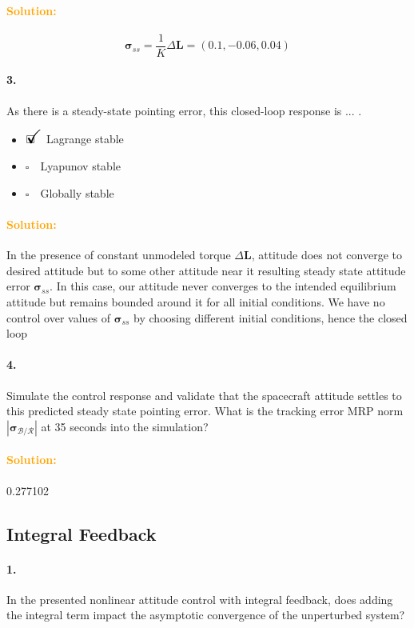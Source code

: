 \documentclass[12pt, a4paper]{article}
\newcommand{\ans}{\item[]$\rlap{\LARGE{\checkmark}}\square\quad$}
\newcommand{\noans}{\item[]$\square\quad$}
\begin{document}
\paragraph{\textcolor{orange}{Solution:}}
$$
\bm{\sigma}_{ss} = \frac{1}{K}\Delta \bm{L} = (0.1, -0.06, 0.04)
$$

\paragraph{3.}
As there is a steady-state pointing error, this closed-loop response is ... .

\begin{itemize}
\ans Lagrange stable
\noans Lyapunov stable
\noans Globally stable
\end{itemize}

\paragraph{\textcolor{orange}{Solution:}} In the presence of constant unmodeled torque   $\Delta\bm{L}$, attitude does not converge to desired attitude but to some other attitude near it resulting steady state attitude error $\bm{\sigma}_{ss}$. In this case, our attitude never converges to the intended equilibrium attitude but remains bounded around it for all initial conditions. We have no control over values of $\bm{\sigma}_{ss}$ by choosing different initial conditions, hence the closed loop 

\paragraph{4.}
Simulate the control response and validate that the spacecraft attitude settles to this predicted steady state pointing error. What is the tracking error MRP norm $|\bm{\sigma}_{\mathcal{B}/\mathcal{R}}|$ at 35 seconds into the simulation?

\paragraph{\textcolor{orange}{Solution:}}
0.277102

\newpage
\subsection{Integral Feedback}
\paragraph{1.}
In the presented nonlinear attitude control with integral feedback, does adding the integral term impact the asymptotic convergence of the unperturbed system?
\end{document}
